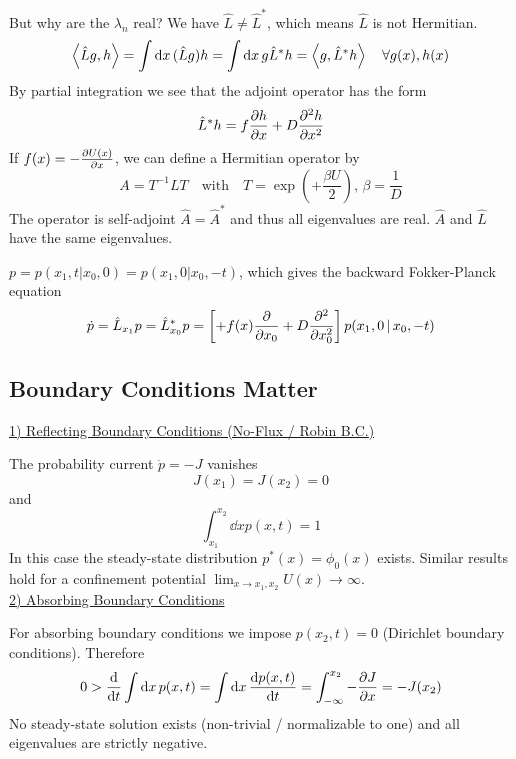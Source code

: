 \documentclass{notebook}
\begin{document}
But why are the $\lambda_n$ real? We have $\hat{L} \neq \hat{L}^*$, which means $\hat{L}$ is not Hermitian.
%
\begin{equation}
\expval{\hat{L}g,h}= \int \dd{x} (\hat{L}g)h = \int \dd{x} g \hat{L}^*h = \expval{g,\hat{L}^* h} \quad \forall g(x), h(x)
\end{equation}
%
By partial integration we see that the adjoint operator has the form
%
\begin{equation}
\hat{L}^*h = f \pdv{h}{x} + D \pdv[2]{h}{x}
\end{equation}
%
If $f(x) = - \pdv{U(x)}{x}$, we can define a Hermitian operator by
%
\begin{equation}
A = T^{-1} L T \quad \mathrm{with} \quad T = \exp(+\frac{\beta U}{2}), \, \beta = \frac{1}{D}
\end{equation}
%
The operator is self-adjoint $\hat{A} = \hat{A}^*$ and thus all eigenvalues are real. $\hat{A}$ and $\hat{L}$ have the same eigenvalues. 

\begin{theorem}
	$p = p(x_1,t|x_0,0) = p(x_1,0|x_0,-t)$, which gives the backward Fokker-Planck equation
	\begin{equation}
	\dot{p} = \hat{L}_{x_1} p = \hat{L}^*_{x_0} p = \left[ + f(x) \pdv{x_0} + D \pdv[2]{x_0} \right] p(x_1,0 \, | \, x_0,-t)
	\end{equation}
\end{theorem}

\subsection*{Boundary Conditions Matter}

\underline{1) Reflecting Boundary Conditions (No-Flux / Robin B.C.)}

The probability current $\dot{p} = -J$ vanishes
%
\begin{equation}
J(x_1) = J(x_2) = 0
\end{equation}
%
and
%
\begin{equation}
\int_{x_1}^{x_2} \dd{x} p(x,t) = 1
\end{equation}
%
In this case the steady-state distribution $p^*(x) = \phi_0(x)$ exists. Similar results hold for a confinement potential $\lim_{x \to x_1, x_2} U(x) \to \infty$. \\

\underline{2) Absorbing Boundary Conditions}

For absorbing boundary conditions we impose $p(x_2,t) = 0$ (Dirichlet boundary conditions). Therefore
%
\begin{equation}
0 > \dv{t} \int \dd{x} p(x,t) = \int \dd{x} \dv{p(x,t)}{t} = \int_{-\infty}^{x_2} -\pdv{J}{x} = -J(x_2)
\end{equation}
%
No steady-state solution exists (non-trivial / normalizable to one) and all eigenvalues are strictly negative.
\end{document}
